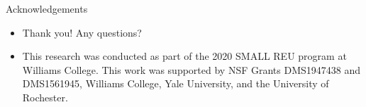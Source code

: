 \documentclass{beamer}
\begin{document}
\begin{frame}{Acknowledgements}
	\begin{itemize}
		\item Thank you! Any questions?
	
		\item This research was conducted as part of the 2020 SMALL REU program at Williams College. This work was supported by NSF Grants DMS1947438 and DMS1561945, Williams College, Yale University, and the University of Rochester.
	\end{itemize}
\end{frame}
\end{document}
